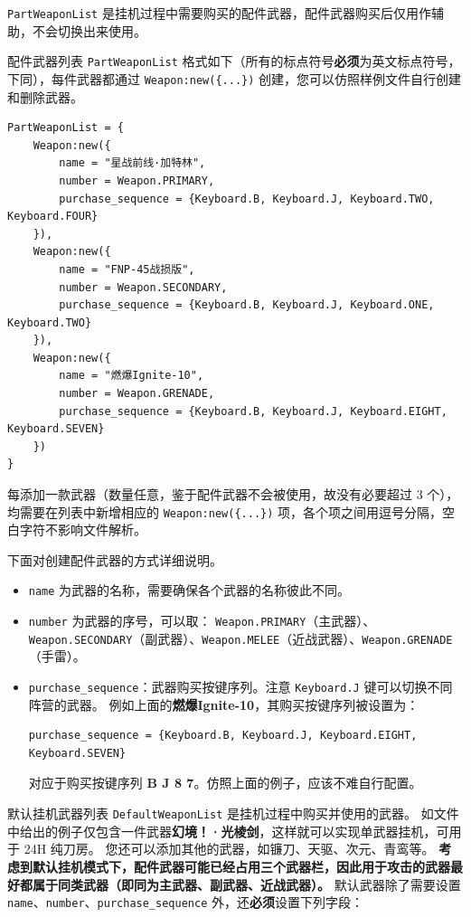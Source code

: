 \lstinline{PartWeaponList} 是挂机过程中需要购买的配件武器，配件武器购买后仅用作辅助，不会切换出来使用。

配件武器列表 \lstinline{PartWeaponList} 格式如下（所有的标点符号\textbf{\color{red}必须}为英文标点符号，下同），每件武器都通过 \lstinline|Weapon:new({...})| 创建，您可以仿照样例文件自行创建和删除武器。

\begin{verbatim}
PartWeaponList = {
    Weapon:new({
        name = "星战前线·加特林",
        number = Weapon.PRIMARY,
        purchase_sequence = {Keyboard.B, Keyboard.J, Keyboard.TWO, Keyboard.FOUR}
    }),
    Weapon:new({
        name = "FNP-45战损版",
        number = Weapon.SECONDARY,
        purchase_sequence = {Keyboard.B, Keyboard.J, Keyboard.ONE, Keyboard.TWO}
    }),
    Weapon:new({
        name = "燃爆Ignite-10",
        number = Weapon.GRENADE,
        purchase_sequence = {Keyboard.B, Keyboard.J, Keyboard.EIGHT, Keyboard.SEVEN}
    })
}
\end{verbatim}

每添加一款武器（数量任意，鉴于配件武器不会被使用，故没有必要超过 3 个），均需要在列表中新增相应的 \lstinline|Weapon:new({...})| 项，各个项之间用逗号分隔，空白字符不影响文件解析。

下面对创建配件武器的方式详细说明。

\begin{itemize}
\item \lstinline{name} 为武器的名称，需要确保各个武器的名称彼此不同。
\item \lstinline{number} 为武器的序号，可以取：
\lstinline{Weapon.PRIMARY}（主武器）、\lstinline{Weapon.SECONDARY}（副武器）、\lstinline{Weapon.MELEE}（近战武器）、\lstinline{Weapon.GRENADE}（手雷）。
\item \lstinline{purchase_sequence}：武器购买按键序列。注意 \lstinline{Keyboard.J} 键可以切换不同阵营的武器。
例如上面的\textbf{\color{red}燃爆Ignite-10}，其购买按键序列被设置为：

\begin{verbatim}
purchase_sequence = {Keyboard.B, Keyboard.J, Keyboard.EIGHT, Keyboard.SEVEN}
\end{verbatim}

对应于购买按键序列 \textbf{\color{red}B J 8 7}。仿照上面的例子，应该不难自行配置。
\end{itemize}

默认挂机武器列表 \lstinline{DefaultWeaponList} 是挂机过程中购买并使用的武器。
如文件中给出的例子仅包含一件武器\textbf{\color{red}幻境！·光棱剑}，这样就可以实现单武器挂机，可用于 24H 纯刀房。
您还可以添加其他的武器，如镰刀、天驱、次元、青鸾等。
\textbf{\color{red} 考虑到默认挂机模式下，配件武器可能已经占用三个武器栏，因此用于攻击的武器最好都属于同类武器（即同为主武器、副武器、近战武器）。}
默认武器除了需要设置 \lstinline{name}、\lstinline{number}、\lstinline{purchase_sequence} 外，还\textbf{\color{red}必须}设置下列字段：

